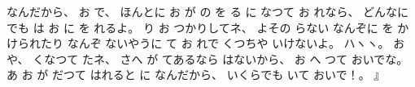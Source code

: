 なんだから、
%
お
で、
%
ほんとに
お
が
の
を
る
に
なつて
お
れなら、
%
どんなにでも
は
お
に
を
れるよ。
%
%
り
お
つかりしてネ、
%
よその
らない
なんぞに
を
かけられたり
なんぞ
ないやうに
て
お
れで
くつちや
いけないよ。
%
ハヽヽ。
%
おや、
%
くなつて
たネ、
%
さへ
が
てあるなら
はないから、
%
お
へ
つて
おいでな。
%
あ
お
が
だつて
はれると
に
なんだから、
%
いくらでも
いて
おいで！。
』
